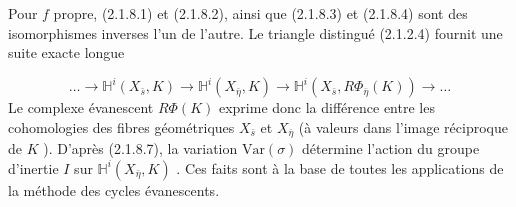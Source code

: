 Pour $f$ propre, (2.1.8.1) et (2.1.8.2), ainsi que (2.1.8.3) et (2.1.8.4) sont des isomorphismes inverses l'un de l'autre. Le triangle distingué (2.1.2.4) fournit une suite exacte longue

\begin{equation}\tag{2.1.8.9}
\ldots \longrightarrow \mathbb{H}^i(X_{\bar{s}}, K) \longrightarrow \mathbb{H}^i(X_{\bar{\eta}}, K) \longrightarrow \mathbb{H}^i(X_{\bar{s}}, R\Phi_{\bar{\eta}}(K)) \longrightarrow \ldots
\end{equation}
Le complexe évanescent $R\Phi(K)$ exprime donc la différence entre les cohomologies des fibres géométriques $X_{\bar{s}}$ et $X_{\bar{\eta}}$ (à valeurs dans l'image réciproque de $K$ ). D'après (2.1.8.7), la variation $\mathrm{Var}(\sigma)$ détermine l'action du groupe d'inertie $I$
sur $\mathbb{H}^i(X_{\bar\eta}, K)$ . Ces faits sont à la base de toutes les applications de la méthode des cycles évanescents.

